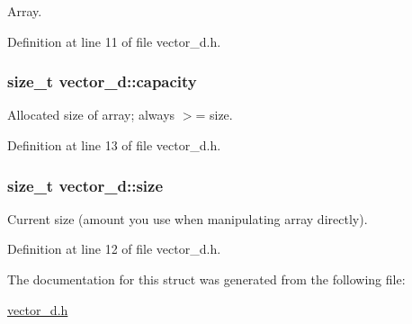 Array. 



Definition at line 11 of file vector\-\_\-d.\-h.

\hypertarget{structvector__d_a83fb5c9689de179f0dfe1413d720cdc3}{
\subsubsection[{capacity}]{\setlength{\rightskip}{0pt plus 5cm}size\-\_\-t vector\-\_\-d\-::capacity}}\label{structvector__d_a83fb5c9689de179f0dfe1413d720cdc3}


Allocated size of array; always $>$= size. 



Definition at line 13 of file vector\-\_\-d.\-h.

\hypertarget{structvector__d_a1a8bccf26d9cef41fd453f6feb2f15b1}{
\subsubsection[{size}]{\setlength{\rightskip}{0pt plus 5cm}size\-\_\-t vector\-\_\-d\-::size}}\label{structvector__d_a1a8bccf26d9cef41fd453f6feb2f15b1}


Current size (amount you use when manipulating array directly). 



Definition at line 12 of file vector\-\_\-d.\-h.



The documentation for this struct was generated from the following file\-:\begin{DoxyCompactItemize}
\item 
\hyperlink{vector__d_8h}{vector\-\_\-d.\-h}\end{DoxyCompactItemize}
